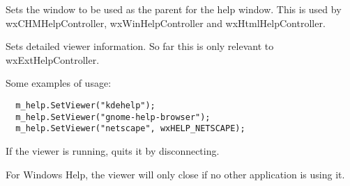 
Sets the window to be used as the parent for the help window. This is used
by wxCHMHelpController, wxWinHelpController and wxHtmlHelpController.

\label{wxhelpcontrollersetviewer}


Sets detailed viewer information. So far this is only relevant to wxExtHelpController.

Some examples of usage:

\begin{verbatim}
  m_help.SetViewer("kdehelp");
  m_help.SetViewer("gnome-help-browser");
  m_help.SetViewer("netscape", wxHELP_NETSCAPE);
\end{verbatim}

\label{wxhelpcontrollerquit}


If the viewer is running, quits it by disconnecting.

For Windows Help, the viewer will only close if no other application is using it.

